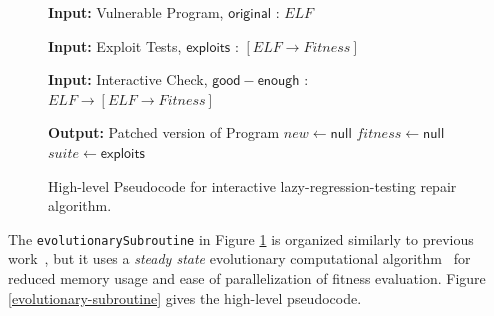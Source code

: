 \documentclass{sigcomm-alternate}
\begin{document}
\begin{figure}[htb]
\begin{algorithmic}[1]
\small
\item[{\textbf{Input: }} {Vulnerable Program, $\mathsf{original}$ : $ELF$}]
\item[{\textbf{Input: }} {Exploit Tests, $\mathsf{exploits}$ : $[ELF \rightarrow Fitness]$}]
\item[{\textbf{Input: }} {Interactive Check, $\mathsf{good-enough}$ : $ELF \rightarrow [ELF \rightarrow Fitness]$}]
\item[{\textbf{Output: }} {Patched version of Program}] 
   $new \leftarrow \mathsf{null}$ 
   $fitness \leftarrow \mathsf{null}$ 
   $suite \leftarrow \mathsf{exploits}$ 
\end{algorithmic}
\caption{\label{lazy-algorithm}High-level Pseudocode for interactive
lazy-regression-testing repair algorithm.}
\end{figure}

The \texttt{evolutionarySubroutine} in Figure \ref{lazy-algorithm} is
organized similarly to previous work~\cite{genprog-tse-journal},
but it uses a \emph{steady state}
evolutionary computational algorithm~\cite{Luke2013Metaheuristics} for
reduced memory usage and ease of parallelization of fitness evaluation.
Figure \ref{evolutionary-subroutine}  gives the high-level pseudocode.
\end{document}
